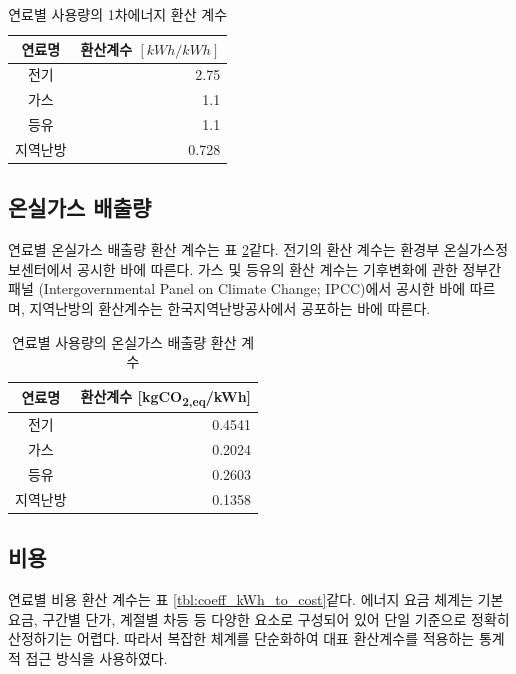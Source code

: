 \begin{table}[ht]
  \caption{연료별 사용량의 1차에너지 환산 계수}
  \label{tbl:coeff_kWh_to_1stkWh}  
  \centering
  \begin{tabular}{cr}
    \toprule
    연료명 & \makecell{환산계수 \\ $[kWh/kWh]$} \\ \midrule
    전기 & 2.75 \\
    가스 & 1.1 \\
    등유 & 1.1 \\
    지역난방 & 0.728 \\ \bottomrule
  \end{tabular}
\end{table}

\subsection{온실가스 배출량}

연료별 온실가스 배출량 환산 계수는 표 \ref{tbl:coeff_kWh_to_CO2}\와 같다. 전기의 환산 계수는 환경부 온실가스정보센터에서 공시한 바에 따른다. 가스 및 등유의 환산 계수는 기후변화에 관한 정부간 패널 (Intergovernmental Panel on Climate Change; IPCC)에서 공시한 바에 따르며, 지역난방의 환산계수는 한국지역난방공사에서 공포하는 바에 따른다.

\begin{table}[ht]
  \caption{연료별 사용량의 온실가스 배출량 환산 계수}
  \label{tbl:coeff_kWh_to_CO2}  
  \centering
  \begin{tabular}{cr}
    \toprule
    연료명 & 환산계수 [kgCO\textsubscript{2,eq}/kWh] \\ \midrule
    전기 & 0.4541 \\
    가스 & 0.2024 \\
    등유 & 0.2603 \\
    지역난방 & 0.1358 \\ \bottomrule
  \end{tabular}
\end{table}

\subsection{비용}
연료별 비용 환산 계수는 표 \ref{tbl:coeff_kWh_to_cost}\와 같다. 에너지 요금 체계는 기본요금, 구간별 단가, 계절별 차등 등 다양한 요소로 구성되어 있어 단일 기준으로 정확히 산정하기는 어렵다. 따라서 복잡한 체계를 단순화하여 대표 환산계수를 적용하는 통계적 접근 방식을 사용하였다.

